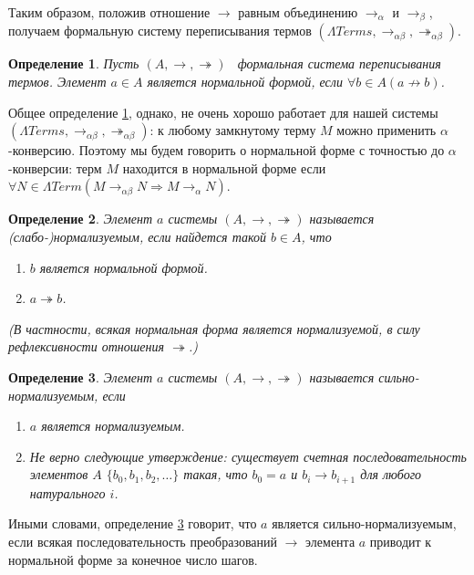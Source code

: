 \documentclass{article}[12pt]
\newtheorem{definition}{Определение}
\newcommand{\dash}{\textemdash\ }
\begin{document}
Таким образом, положив отношение $\rightarrow$ равным объединению $\rightarrow_\alpha$ и $\rightarrow_\beta$,
получаем формальную систему переписывания термов $(\Lambda Terms, \rightarrow_{\alpha \beta}, \twoheadrightarrow_{\alpha \beta})$.

\begin{definition}
    \label{NormalFormDefinition}
    Пусть $(A, \rightarrow, \twoheadrightarrow)$ \dash формальная система переписывания термов.
    Элемент $a \in A$ является нормальной формой, если $\forall b \in A (a \not \rightarrow b)$.
\end{definition}

Общее определение \ref{NormalFormDefinition}, однако, не очень хорошо работает
для нашей системы $(\Lambda Terms, \rightarrow_{\alpha \beta}, \twoheadrightarrow_{\alpha \beta})$:
к любому замкнутому терму $M$ можно применить $\alpha$-конверсию. Поэтому мы будем говорить 
о нормальной форме с точностью до $\alpha$-конверсии: терм $M$ находится в нормальной форме
если $\forall N \in \Lambda Term (M \rightarrow_{\alpha \beta} N \Rightarrow M \rightarrow_\alpha N)$.

\begin{definition}
    \label{NormalizationDefinition}
    Элемент $a$ системы $(A, \rightarrow, \twoheadrightarrow)$ называется (слабо-)нормализуемым, если
    найдется такой $b \in A$, что 
    \begin{enumerate}
        \item $b$ является нормальной формой.
        \item $a \twoheadrightarrow b$.
    \end{enumerate}
    (В частности, всякая нормальная форма является нормализуемой, в силу рефлексивности отношения
    $\twoheadrightarrow$.)
\end{definition}

\begin{definition}
    \label{StrongNormalizationDefinition}
    Элемент $a$ системы $(A, \rightarrow, \twoheadrightarrow)$ называется сильно-нормализуемым,
    если
    \begin{enumerate}
        \item $a$ является нормализуемым.
        \item Не верно следующие утверждение: существует счетная последовательность
        элементов $A$ $\{ b_0, b_1, b_2, \dots \}$ такая, что $b_0 = a$ и 
        $b_i \rightarrow b_{i+1}$ для любого натурального $i$.
    \end{enumerate}
\end{definition}
Иными словами, определение \ref{StrongNormalizationDefinition} говорит, что $a$ является
сильно-нормализуемым, если всякая последовательность преобразований $\rightarrow$ элемента $a$ приводит
к нормальной форме за конечное число шагов.
\end{document}
